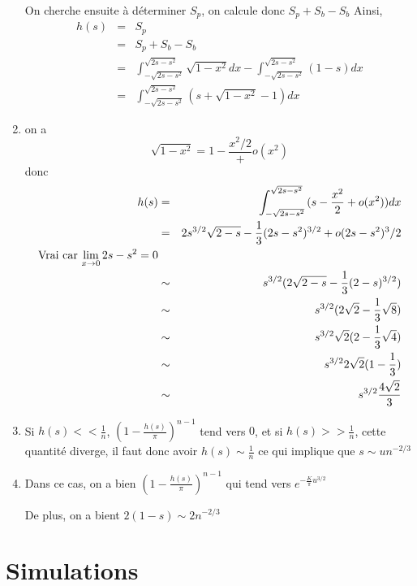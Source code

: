 \documentclass[a4paper,12pt,twoside]{article}
\begin{document}
\begin{enumerate}
			On cherche ensuite à déterminer $S_p$, on calcule donc $S_p + S_b - S_b$
			Ainsi, \begin{eqnarray}
				h(s)	&=& S_p \\
					&=& S_p + S_b - S_b \\
					&=& \int^{\sqrt{2s - s^2}}_{-\sqrt{2s - s^2}}{\sqrt{1-x^2}dx} - \int^{\sqrt{2s - s^2}}_{-\sqrt{2s - s^2}}{(1 - s) dx} \\
					&=& \int^{\sqrt{2s - s^2}}_{-\sqrt{2s - s^2}}{(s + \sqrt{1-x^2} - 1) dx}
			\end{eqnarray}

		\item on a $$\sqrt{1 - x^2} = 1 - \frac{x^2/2} + o(x^2)$$
		donc
		\begin{eqnarray}
			h(s)	&=& \int^{\sqrt{2s - s^2}}_{-\sqrt{2s - s^2}}{(s - \frac{x^2}{2} + o(x^2)) dx} \\
				&=& 2s^{3/2}\sqrt{2-s} - \frac{1}{3}(2s - s^2)^{3/2} + o(2s-s^2)^3/2 \\\text{Vrai car $ \lim_{x \to 0} 2s - s^2 = 0$}\\ %
				&\sim& s^{3/2} (2\sqrt{2-s} - \frac{1}{3}(2 - s)^{3/2}) \\
				&\sim& s^{3/2} (2\sqrt{2} - \frac{1}{3}\sqrt{8}) \\
				&\sim& s^{3/2} \sqrt{2}(2 - \frac{1}{3}\sqrt{4}) \\
				&\sim& s^{3/2} 2\sqrt{2}(1 - \frac{1}{3}) \\
				&\sim& s^{3/2} \frac{4\sqrt{2}}{3} \\
		\end{eqnarray}
		\item	Si $h(s) << \frac{1}{n}$, $\left(1 - \frac{h(s)}{\pi}\right)^{n-1}$ tend vers $0$, et si $h(s) >> \frac{1}{n}$, cette quantité diverge, il faut donc avoir $h(s) \sim \frac{1}{n}$ ce qui implique que $s \sim un^{-2/3}$%

		\item Dans ce cas, on a bien $\left(1 - \frac{h(s)}{\pi}\right)^{n-1}$ qui tend vers $e^{-\frac{K}{\pi}u^{3/2}}$

		De plus, on a bient $2(1-s) \sim 2n^{-2/3}$

		\end{enumerate}

\section*{Simulations}
\end{document}

